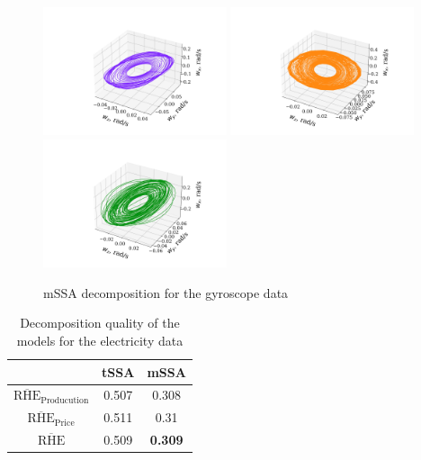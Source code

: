 \documentclass[referee, pdflatex, sn-mathphys-num]{sn-jnl}
\theoremstyle{definition}
\theoremstyle{plain}
\begin{document}
	\begin{figure}[h]
		\centering
		\includegraphics[width=0.48\textwidth, keepaspectratio]{gyro_1_mssa.png}
		\includegraphics[width=0.48\textwidth, keepaspectratio]{gyro_2_mssa.png}
		\includegraphics[width=0.48\textwidth, keepaspectratio]{gyro_3_mssa.png}
		\caption{mSSA decomposition for the gyroscope data}\label{fig:gyro_decomp_mssa}
	\end{figure}
	
	\def\arraystretch{1.2}
	\begin{table}[h!]
		\centering
		\caption{Decomposition quality of the models for the electricity data}\label{tab:decomp_electr_results}
		\begin{tabular}{|c|c|c|}
			\hline
			& tSSA  & mSSA           \\ \hline
			$ \overline{\text{RHE}}_{\text{Producution}} $  & 0.507 & 0.308          \\ \hline
			$ \overline{\text{RHE}}_{\text{Price}} $      & 0.511 & 0.31           \\ \hline
			$ \overline{\text{RHE}} $             & 0.509 & \textbf{0.309} \\ \hline
		\end{tabular}
	\end{table}
	
\end{document}
